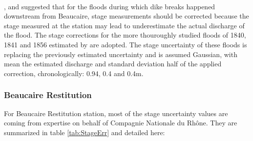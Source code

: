 \documentclass[11pt]{article}
\begin{document}
    \paragraph{}
        \citet{symadrem_programme_2012}, \citet{pichard_hauteurs_2013} and \citet{bard_actualisation_2018} suggested that for the floods during which dike breaks happened downstream from Beaucaire, stage measurements should be corrected because the stage measured at the station may lead to underestimate the actual discharge of the flood. The stage corrections for the more thouroughly studied floods of 1840, 1841 and 1856 estimated by \citet{symadrem_programme_2012} are adopted. The stage uncertainty of these floods is replacing the previously estimated uncertainty and is assumed Gaussian, with mean the estimated discharge and standard deviation 
        half of the applied correction, chronologically: 0.94, 0.4 and 0.4m. 

    \subsubsection{Beaucaire Restitution}
    
    For Beaucaire Restitution station, most of the stage uncertainty values are coming from \citet{cetiat_conference_2005} expertise on behalf of Compagnie Nationale du Rhône. They are summarized in table \ref{tab:StageErr} and detailed here:
    
\end{document}
